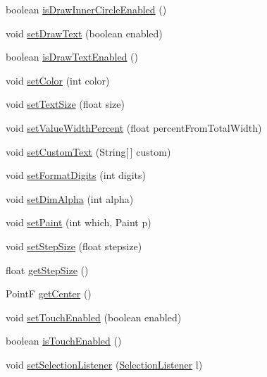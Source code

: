 \begin{DoxyCompactItemize}
\item 
boolean \hyperlink{classcs_1_1nsense_1_1_circle_display_a736b82607954832ecea5334add4d8cbc}{is\-Draw\-Inner\-Circle\-Enabled} ()
\item 
void \hyperlink{classcs_1_1nsense_1_1_circle_display_af0aec7e5d6a7eaaac04b903717600d4a}{set\-Draw\-Text} (boolean enabled)
\item 
boolean \hyperlink{classcs_1_1nsense_1_1_circle_display_a2b5c4d17b51f13a1b28d9e7ba1980dd3}{is\-Draw\-Text\-Enabled} ()
\item 
void \hyperlink{classcs_1_1nsense_1_1_circle_display_aee92bc2564a92c9448ea5ff67314ae9f}{set\-Color} (int color)
\item 
void \hyperlink{classcs_1_1nsense_1_1_circle_display_ac67201943014e87c9e026651ea4b6238}{set\-Text\-Size} (float size)
\item 
void \hyperlink{classcs_1_1nsense_1_1_circle_display_a84297832383b2c7764e93617fc6dca0f}{set\-Value\-Width\-Percent} (float percent\-From\-Total\-Width)
\item 
void \hyperlink{classcs_1_1nsense_1_1_circle_display_a06b0b490a0190bc7b9c97f72e0768b10}{set\-Custom\-Text} (String\mbox{[}$\,$\mbox{]} custom)
\item 
void \hyperlink{classcs_1_1nsense_1_1_circle_display_a0f4a27c0e20aff2aa4be0d4a17cafbdc}{set\-Format\-Digits} (int digits)
\item 
void \hyperlink{classcs_1_1nsense_1_1_circle_display_a0ed645671d09dcae0e0f5e9555627dd4}{set\-Dim\-Alpha} (int alpha)
\item 
void \hyperlink{classcs_1_1nsense_1_1_circle_display_a27184622c24fbd75aebd05e3243ff1f9}{set\-Paint} (int which, Paint p)
\item 
void \hyperlink{classcs_1_1nsense_1_1_circle_display_a42fc3abded404b3fb1a5c785b9a5bd74}{set\-Step\-Size} (float stepsize)
\item 
float \hyperlink{classcs_1_1nsense_1_1_circle_display_a69f33c60e89352461995feeff1d7f376}{get\-Step\-Size} ()
\item 
Point\-F \hyperlink{classcs_1_1nsense_1_1_circle_display_a029b48c181594ec315262638ef7dd584}{get\-Center} ()
\item 
void \hyperlink{classcs_1_1nsense_1_1_circle_display_aa0830624ca4883f5929dc25f30ba6cc3}{set\-Touch\-Enabled} (boolean enabled)
\item 
boolean \hyperlink{classcs_1_1nsense_1_1_circle_display_ae868b6541e52cfc835267f526aca42ba}{is\-Touch\-Enabled} ()
\item 
void \hyperlink{classcs_1_1nsense_1_1_circle_display_a718d3608088077a780bda0957969226b}{set\-Selection\-Listener} (\hyperlink{interfacecs_1_1nsense_1_1_circle_display_1_1_selection_listener}{Selection\-Listener} l)

\end{DoxyCompactItemize}
